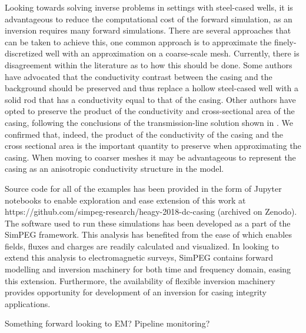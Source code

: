 Looking towards solving inverse problems in settings with steel-cased wells, it is advantageous to reduce the computational cost of the forward simulation, as an inversion requires many forward simulations. There are several approaches that can be taken to achieve this, one common approach is to approximate the finely-discretized well with an approximation on a coarse-scale mesh. Currently, there is disagreement within the literature as to how this should be done. Some authors have advocated that the conductivity contrast between the casing and the background should be preserved and thus replace a hollow steel-cased well with a solid rod that has a conductivity equal to that of the casing. Other authors have opted to preserve the product of the conductivity and cross-sectional area of the casing, following the conclusions of the transmission-line solution shown in \cite{Kaufman1990}. We confirmed that, indeed, the product of the conductivity of the casing and the cross sectional area is the important quantity to preserve when approximating the casing. When moving to coarser meshes it may be advantageous to represent the casing as an anisotropic conductivity structure in the model.

Source code for all of the examples has been provided in the form of Jupyter notebooks to enable exploration and ease extension of this work at https://github.com/simpeg-research/heagy-2018-dc-casing (archived on Zenodo). The software used to run these simulations has been developed as a part of the SimPEG framework. This analysis has benefited from the ease of which enables fields, fluxes and charges are readily calculated and visualized. In looking to extend this analysis to electromagnetic surveys, SimPEG contains forward modelling and inversion machinery for both time and frequency domain, easing this extension. Furthermore, the availability of flexible inversion machinery provides opportunity for development of an inversion for casing integrity applications.

Something forward looking to EM? Pipeline monitoring?

